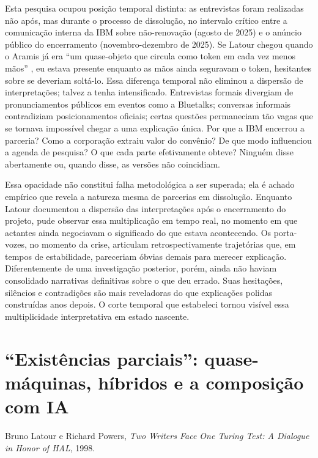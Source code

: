 Esta pesquisa ocupou posição temporal distinta: as entrevistas foram realizadas não após, mas durante o processo de dissolução, no intervalo crítico entre a comunicação interna da IBM sobre não-renovação (agosto de 2025) e o anúncio público do encerramento (novembro-dezembro de 2025). Se Latour chegou quando o Aramis já era ``um quase-objeto que circula como token em cada vez menos mãos'' \parencite[p. 15]{Latour1993Aramis}, eu estava presente enquanto as mãos ainda seguravam o token, hesitantes sobre se deveriam soltá-lo. Essa diferença temporal não eliminou a dispersão de interpretações; talvez a tenha intensificado. Entrevistas formais divergiam de pronunciamentos públicos em eventos como a Bluetalks; conversas informais contradiziam posicionamentos oficiais; certas questões permaneciam tão vagas que se tornava impossível chegar a uma explicação única. Por que a IBM encerrou a parceria? Como a corporação extraiu valor do convênio? De que modo influenciou a agenda de pesquisa? O que cada parte efetivamente obteve? Ninguém disse abertamente ou, quando disse, as versões não coincidiam.

Essa opacidade não constitui falha metodológica a ser superada; ela é achado empírico que revela a natureza mesma de parcerias em dissolução. Enquanto Latour documentou a dispersão das interpretações após o encerramento do projeto, pude observar essa multiplicação em tempo real, no momento em que actantes ainda negociavam o significado do que estava acontecendo. Os porta-vozes, no momento da crise, articulam retrospectivamente trajetórias que, em tempos de estabilidade, pareceriam óbvias demais para merecer explicação. Diferentemente de uma investigação posterior, porém, ainda não haviam consolidado narrativas definitivas sobre o que deu errado. Suas hesitações, silêncios e contradições são mais reveladoras do que explicações polidas construídas anos depois. O corte temporal que estabeleci tornou visível essa multiplicidade interpretativa em estado nascente.

\section{``Existências parciais'': quase-máquinas, híbridos e a composição com IA}
\label{subsec:existencias-parciais}

{Bruno Latour e Richard Powers, \textit{Two Writers Face One Turing Test: A Dialogue in Honor of HAL}, 1998.}

